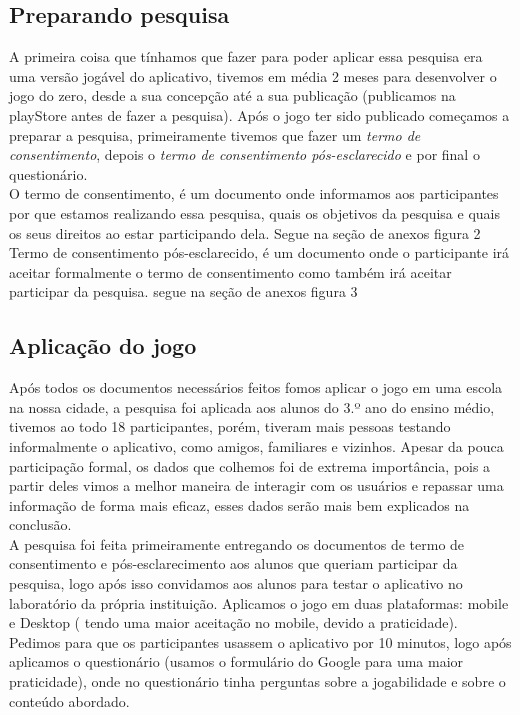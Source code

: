\documentclass[12pt]{article}
\begin{document}
	\subsection{Preparando pesquisa} %
		A primeira coisa que tínhamos que fazer para poder aplicar essa pesquisa era uma versão jogável do aplicativo, tivemos em média 2 meses para desenvolver o jogo do zero, desde a sua concepção até a sua publicação (publicamos na playStore antes de fazer a pesquisa). Após o jogo ter sido publicado começamos a preparar a pesquisa, primeiramente tivemos que fazer um \textit{termo de consentimento}, depois o \textit{termo de consentimento pós-esclarecido} e por final o questionário.\\
		
		O termo de consentimento, é um documento onde informamos aos participantes por que estamos realizando essa pesquisa, quais os objetivos da pesquisa e quais os seus direitos ao estar participando dela. Segue na seção de anexos figura 2 \\
		
		Termo de consentimento pós-esclarecido, é um documento onde o participante irá aceitar formalmente o termo de consentimento como também irá aceitar participar da pesquisa. segue na seção de anexos figura 3 \\
		
	
	\subsection{Aplicação do jogo}%
		Após todos os documentos necessários feitos fomos aplicar o jogo em uma escola na nossa cidade, a pesquisa foi aplicada aos alunos do 3.º ano do ensino médio, tivemos ao todo 18 participantes, porém, tiveram mais pessoas testando informalmente o aplicativo, como amigos, familiares e vizinhos. Apesar da pouca participação formal, os dados que colhemos foi de extrema importância, pois a partir deles vimos a melhor maneira de interagir com os usuários e repassar uma informação de forma mais eficaz, esses dados serão mais bem explicados na conclusão.\\
		
		
		A pesquisa foi feita primeiramente entregando os documentos de termo de consentimento e pós-esclarecimento aos alunos que queriam participar da pesquisa, logo após isso convidamos aos alunos para testar o aplicativo no laboratório da própria instituição. Aplicamos o jogo em duas plataformas: mobile e Desktop ( tendo uma maior aceitação no mobile, devido a praticidade). Pedimos para que os participantes usassem o aplicativo por 10 minutos, logo após aplicamos o questionário (usamos o formulário do Google para uma maior praticidade), onde no questionário tinha perguntas sobre a jogabilidade e sobre o conteúdo abordado.\\
		
\end{document}
